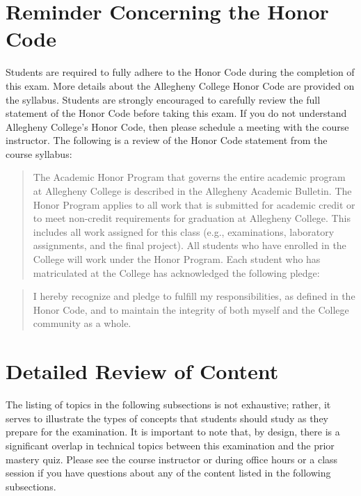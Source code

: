 \documentclass[11pt]{article}
\begin{document}
\section*{Reminder Concerning the Honor Code}

\noindent Students are required to fully adhere to the Honor Code during the
completion of this exam. More details about the Allegheny College Honor Code are
provided on the syllabus. Students are strongly encouraged to carefully review
the full statement of the Honor Code before taking this exam. If you do not
understand Allegheny College's Honor Code, then please schedule a meeting with
the course instructor. The following is a review of the Honor Code statement
from the course syllabus:

\begin{quote}
The Academic Honor Program that governs the entire academic program at
Allegheny College is described in the Allegheny Academic Bulletin. The Honor
Program applies to all work that is submitted for academic credit or to meet
non-credit requirements for graduation at Allegheny College. This includes all
work assigned for this class (e.g., examinations, laboratory assignments, and
the final project). All students who have enrolled in the College will work
under the Honor Program. Each student who has matriculated at the College has
acknowledged the following pledge:
\end{quote}

\vspace*{-.15in}

\begin{quote}
  I hereby recognize and pledge to fulfill my responsibilities, as defined in
  the Honor Code, and to maintain the integrity of both myself and the College
  community as a whole.
\end{quote}

\section*{Detailed Review of Content}

The listing of topics in the following subsections is not exhaustive; rather, it
serves to illustrate the types of concepts that students should study as they
prepare for the examination. It is important to note that, by design, there is a
significant overlap in technical topics between this examination and the prior
mastery quiz. Please see the course instructor or during office hours or a class
session if you have questions about any of the content listed in the following
subsections.
\end{document}
